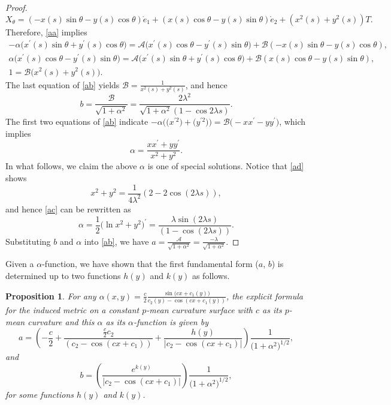 \documentclass[10pt,a4paper]{amsart}
\numberwithin{equation}{section}
\newtheorem{Proposition}[Theorem]{Proposition}
\begin{document}
\begin{proof}
\begin{equation*}
X_\theta=(-x(s)\sin \theta-y(s)\cos \theta)\mathring e_1+(x(s)\cos \theta-y(s)\sin
\theta)\mathring e_2+(x^2(s)+y^2(s))T.
\end{equation*}
Therefore, \eqref{aa} implies
\begin{gather}
-\alpha\bigl(x^{\prime }(s)\sin \theta+y^{\prime }(s)\cos \theta\bigr)= \mathcal{A}\bigl(x^{\prime
}(s)\cos \theta-y^{\prime }(s)\sin \theta\bigr)+\mathcal{B}(-x(s)\sin \theta-y(s)\cos
\theta),\nonumber \\
\alpha\bigl(x^{\prime }(s)\cos \theta-y^{\prime }(s)\sin \theta\bigr)=\mathcal{A}\bigl(x^{\prime
}(s)\sin \theta+y^{\prime }(s)\cos \theta\bigr)+\mathcal{B}(x(s)\cos \theta-y(s)\sin \theta),\nonumber
\\
1=\mathcal{B}\bigl(x^2(s)+y^2(s)\bigr). \label{ab}
\end{gather}
The last equation of \eqref{ab} yields
$
\mathcal{B}=\frac{1}{x^2(s)+y^2(s)}$,
and hence
\[
b=\frac{\mathcal{B}}{\sqrt{1+\alpha^2}}=\frac{2\lambda^{2}}{\sqrt{1+\alpha^2}(1-\cos{2\lambda s})}.
\]
The first two equations of \eqref{ab} indicate
$
-\alpha\bigl(\bigl(x^{\prime 2}\bigr)+\bigl(y^{\prime 2}\bigr)\bigr)=\mathcal{B}\bigl(-xx^{\prime }-yy^{\prime }\bigr)$,
which implies
\begin{equation} \label{ac}
\alpha=\frac{xx^{\prime }+yy^{\prime }}{x^2+y^2}.
\end{equation}
In what follows, we claim the above $\alpha$ is one of special solutions.
Notice that \eqref{ad} shows
\[
x^2+y^2=\frac{1}{4\lambda^2}(2-2\cos(2\lambda s)),
\]
and hence \eqref{ac} can be rewritten as
\begin{equation*}
\alpha=\frac{1}{2}\bigl(\ln x^2+y^2\bigr)^{\prime }=\frac{\lambda \sin(2\lambda s)}{(1-\cos(2\lambda s))}.
\end{equation*}
Substituting $b$ and $\alpha$ into \eqref{ab}, we have
$
a=\frac{\mathcal{A}}{\sqrt{1+\alpha^2}}=\frac{-\lambda}{\sqrt{1+\alpha^2}}$.
\end{proof}

Given a $\alpha$-function, we have shown \cite{ChiuH/LiuH:2022} that the first fundamental form ($a$, $b$) is determined up to two functions $h(y)$ and $k(y)$ as follows.
\begin{Proposition}
\label{metricform} For any $\alpha(x,y)=\frac{c}{2}\frac{\sin{(cx+c_{1}(y)})
}{c_{2}(y)-\cos{(cx+c_{1}(y))}}$, the explicit formula for the induced
metric on a constant $p$-mean curvature surface with $c$ as its $p$-mean
curvature and this $\alpha$ as its $\alpha$-function is given by
\begin{equation*} \label{meta}
a=\left(-\frac{c}{2}+\frac{\frac{c}{2}c_{2}}{(c_{2}-\cos{(cx+c_{1})})}+\frac{
h(y)}{|c_{2}-\cos{(cx+c_{1})}|}\right)\frac{1}{\bigl(1+\alpha^{2}\bigr)^{1/2}},
\end{equation*}
and
\begin{equation*} \label{metb}
b=\left(\frac{e^{k(y)}}{|c_{2}-\cos{(cx+c_{1})}|}\right)\frac{1}{
\bigl(1+\alpha^{2}\bigr)^{1/2}},
\end{equation*}
for some functions $h(y)$ and $k(y)$.
\end{Proposition}
\end{document}
